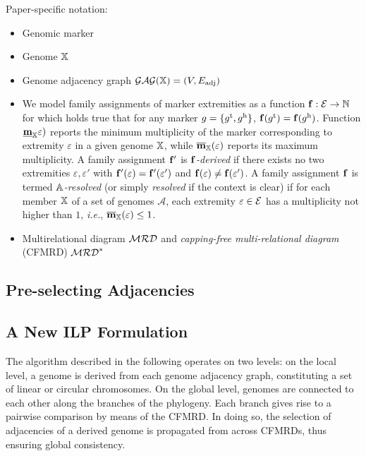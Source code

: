 \documentclass[runningheads]{llncs}
\begin{document}
Paper-specific notation:

\begin{itemize}
    \item Genomic marker 
    \item Genome $\mathbb{X}$
    \item Genome adjacency graph $\mathcal{GAG}(\mathbb{X}) = (V, {E}_\text{adj})$ 
    \item 
We model family assignments of marker extremities as a function $\mathbf{f}: \mathcal{E} \to \mathbb N$ for which holds true that for any marker $g = \{g^{\textnormal{t}}, g^{\textnormal{h}}\}$, $\mathbf{f}(g^{\textnormal{t}}) = \mathbf{f}(g^{\textnormal{h}})$.  
Function 
$\underline{\mathbf{m}}_{\mathbb{X}}\varepsilon)$ reports the minimum multiplicity of the marker corresponding to extremity $\varepsilon$ in a given genome $\mathbb{X}$, while $\overline{\mathbf{m}}_{\mathbb{X}}(\varepsilon)$ reports its maximum multiplicity. 
A family assignment $\mathbf{f}'$ is \emph{$\mathbf{f}$-derived} if there exists no two extremities $\varepsilon, \varepsilon'$ with $\mathbf{f}'(\varepsilon) = \mathbf{f}'(\varepsilon')$ and $\mathbf{f}(\varepsilon) \neq \mathbf{f}(\varepsilon')$.  
A family assignment $\mathbf{f}$ is termed \emph{$\mathcal {\mathbb{A}}$-resolved} (or simply \emph{resolved} if the context is clear) if for each member $\mathbb{X}$ of a set of genomes $\mathcal A$, each extremity $\varepsilon \in \mathcal{E} $ has a multiplicity not higher than $1$, \emph{i.e.}, $\overline{\mathbf{m}}_{\mathbb{X}}(\varepsilon)\leq 1$.  


    \item Multirelational diagram $\mathcal{MRD}$ and \emph{capping-free multi-relational diagram} (CFMRD) $\mathcal{MRD}^*$
\end{itemize}
\subsection{Pre-selecting Adjacencies}
\subsection{A New ILP Formulation}
The algorithm described in the following operates on two levels: 
on the local level, a genome is derived from each genome adjacency graph, constituting a set of linear or circular chromosomes. 
On the global level, genomes are connected to each other along the branches of the phylogeny. Each branch gives rise to a pairwise comparison by means of the CFMRD. 
In doing so, the selection of adjacencies of a derived genome is propagated from across CFMRDs, thus ensuring global consistency. 
\end{document}
